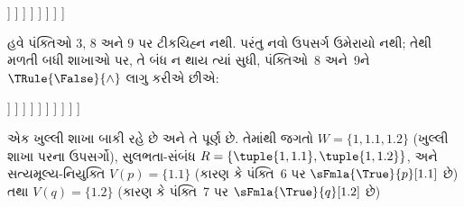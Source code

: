 \documentclass[../../../include/open-logic-section]{subfiles}
\begin{document}
{\begin{ex}
\begin{oltableau}
                  [\pFmla{\False}{p \land q}{1.1}, 
                    just = {\TRule{\False}{\Diamond}[3]}
                    [\pFmla{\False}{p \land q}{1.2}, 
                      just = {\TRule{\False}{\Diamond}[3]}
                    ]
                  ]
                ]
              ]
            ]
          ]
        ]
      ]
    ]
  \end{oltableau}
  હવે પંક્તિઓ 3, 8 અને 9 પર ટીકચિહ્ન નથી. પરંતુ નવો
  ઉપસર્ગ ઉમેરાયો નથી; તેથી મળતી બધી શાખાઓ પર, તે બંધ ન
  થાય ત્યાં સુધી, પંક્તિઓ~8 અને~9ને
  $\TRule{\False}{\land}$ લાગુ કરીએ છીએ:
  \begin{oltableau}
    [\pFmla{\False}{(\Diamond p \land \Diamond q) \lif \Diamond(p \land q)}{1},
      just = \TAss, checked
      [\pFmla{\True}{\Diamond p \land \Diamond q}{1},
        just = {\TRule{\False}{\lif}[1]}, checked
        [\pFmla{\False}{\Diamond(p \land q)}{1},
          just = {\TRule{\False}{\lif}[1]}
          [\pFmla{\True}{\Diamond p}{1},
            just = {\TRule{\True}{\land}[2]}, checked
            [\pFmla{\True}{\Diamond q}{1},
              just = {\TRule{\True}{\land}[2]}, checked
              [\pFmla{\True}{p}{1.1}, 
                just = {\TRule{\True}{\Diamond}[4]}, checked
                [\pFmla{\True}{q}{1.2}, 
                  just = {\TRule{\True}{\Diamond}[5]}, checked
                  [\pFmla{\False}{p \land q}{1.1}, 
                    just = {\TRule{\False}{\Diamond}[3]}, checked
                    [\pFmla{\False}{p \land q}{1.2}, 
                      just = {\TRule{\False}{\Diamond}[3]}, checked
                      [\pFmla{\False}{p}{1.1},
                        just = {\TRule{\False}{\land}[8]}, checked, close
                      ]
                      [\pFmla{\False}{q}{1.1},
                        just = {\TRule{\False}{\land}[8]}, checked
                        [\pFmla{\False}{p}{1.2},
                          just = {\TRule{\False}{\land}[9]}, checked]
                        [\pFmla{\False}{q}{1.2},
                          just = {\TRule{\False}{\land}[9]}, checked, close]
                      ]
                    ]
                  ]
                ]
              ]
            ]
          ]
        ]
      ]
    ]
  \end{oltableau}
  એક ખુલ્લી શાખા બાકી રહે છે અને તે પૂર્ણ છે. તેમાંથી
  જગતો $W = \{1, 1.1, 1.2\}$ (ખુલ્લી શાખા પરના ઉપસર્ગો),
  સુલભતા-સંબંધ $R = \{\tuple{1, 1.1}, \tuple{1, 1.2}\}$,
  અને સત્યમૂલ્ય-નિયુક્તિ $V(p) = \{1.1\}$ (કારણ કે પંક્તિ~6 પર
  $\sFmla{\True}{p}[1.1]$ છે) તથા $V(q) = \{1.2\}$
  (કારણ કે પંક્તિ~7 પર $\sFmla{\True}{q}[1.2]$ છે)

\end{ex}}
\end{document}
